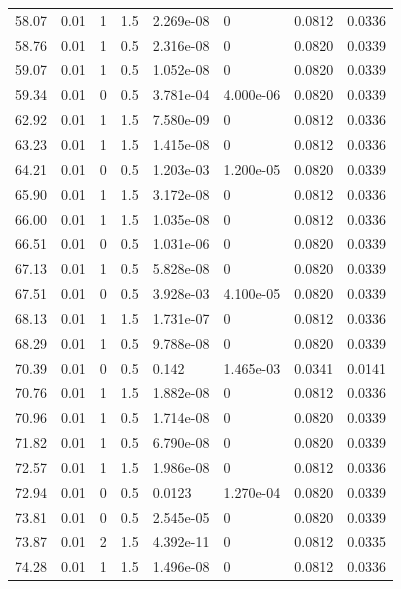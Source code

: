 \documentclass[preview]{standalone}
\begin{document}
{{{\begin{tabular}{L{1.2cm}C{1.2cm} C{0.3cm}C{0.5cm} C{1.4cm}C{1.4cm} C{1.4cm}C{1.4cm}}
  58.07  &  0.01  & 1     & 1.5 &  2.269e-08  & 0  & 0.0812 &  0.0336   \\ 
  58.76  &  0.01  & 1     & 0.5 &  2.316e-08  & 0  & 0.0820 &  0.0339   \\ 
  59.07  &  0.01  & 1     & 0.5 &  1.052e-08  & 0  & 0.0820 &  0.0339   \\ 
  59.34  &  0.01  & 0     & 0.5 &  3.781e-04  & 4.000e-06  & 0.0820 &  0.0339   \\ 
  62.92  &  0.01  & 1     & 1.5 &  7.580e-09  & 0  & 0.0812 &  0.0336   \\ 
  63.23  &  0.01  & 1     & 1.5 &  1.415e-08  & 0  & 0.0812 &  0.0336   \\ 
  64.21  &  0.01  & 0     & 0.5 &  1.203e-03  & 1.200e-05  & 0.0820 &  0.0339   \\ 
  65.90  &  0.01  & 1     & 1.5 &  3.172e-08  & 0  & 0.0812 &  0.0336   \\ 
  66.00  &  0.01  & 1     & 1.5 &  1.035e-08  & 0  & 0.0812 &  0.0336   \\ 
  66.51  &  0.01  & 0     & 0.5 &  1.031e-06  & 0  & 0.0820 &  0.0339   \\ 
  67.13  &  0.01  & 1     & 0.5 &  5.828e-08  & 0  & 0.0820 &  0.0339   \\ 
  67.51  &  0.01  & 0     & 0.5 &  3.928e-03  & 4.100e-05  & 0.0820 &  0.0339   \\ 
  68.13  &  0.01  & 1     & 1.5 &  1.731e-07  & 0  & 0.0812 &  0.0336   \\ 
  68.29  &  0.01  & 1     & 0.5 &  9.788e-08  & 0  & 0.0820 &  0.0339   \\ 
  70.39  &  0.01  & 0     & 0.5 &  0.142  & 1.465e-03  & 0.0341 &  0.0141   \\ 
  70.76  &  0.01  & 1     & 1.5 &  1.882e-08  & 0  & 0.0812 &  0.0336   \\ 
  70.96  &  0.01  & 1     & 0.5 &  1.714e-08  & 0  & 0.0820 &  0.0339   \\ 
  71.82  &  0.01  & 1     & 0.5 &  6.790e-08  & 0  & 0.0820 &  0.0339   \\ 
  72.57  &  0.01  & 1     & 1.5 &  1.986e-08  & 0  & 0.0812 &  0.0336   \\ 
  72.94  &  0.01  & 0     & 0.5 &  0.0123  & 1.270e-04  & 0.0820 &  0.0339   \\ 
  73.81  &  0.01  & 0     & 0.5 &  2.545e-05  & 0  & 0.0820 &  0.0339   \\ 
  73.87  &  0.01  & 2     & 1.5 &  4.392e-11  & 0  & 0.0812 &  0.0335   \\ 
  74.28  &  0.01  & 1     & 1.5 &  1.496e-08  & 0  & 0.0812 &  0.0336   \\ 

\end{tabular}}}}
\end{document}
